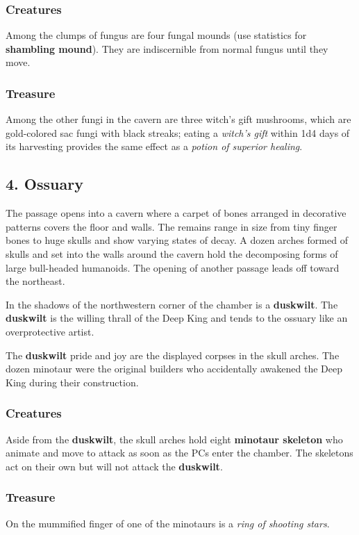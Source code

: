 \documentclass[10pt,a4paper,twoside,bg=print,twocolumn,openany,nodeprecatedcode]{dndbook}
\begin{document}
\subsubsection{Creatures}
Among the clumps of fungus are four fungal mounds (use statistics for \textbf{shambling mound}). They are indiscernible from normal fungus until they move.

\subsubsection{Treasure}
Among the other fungi in the cavern are three witch's gift mushrooms, which are gold-colored sac fungi with black streaks; eating a \textit{witch's gift} within 1d4 days of its harvesting provides the same effect as a \textit{potion of superior healing}.

\subsection{4. Ossuary}
\begin{DndReadAloud}{}
The passage opens into a cavern where a carpet of bones arranged in decorative patterns covers the floor and walls. The remains range in size from tiny finger bones to huge skulls and show varying states of decay. A dozen arches formed of skulls and set into the walls around the cavern hold the decomposing forms of large bull-headed humanoids. The opening of another passage leads off toward the northeast.

\end{DndReadAloud}

In the shadows of the northwestern corner of the chamber is a \textbf{duskwilt}. The \textbf{duskwilt} is the willing thrall of the Deep King and tends to the ossuary like an overprotective artist.

The \textbf{duskwilt} pride and joy are the displayed corpses in the skull arches. The dozen minotaur were the original builders who accidentally awakened the Deep King during their construction.

\subsubsection{Creatures}
Aside from the \textbf{duskwilt}, the skull arches hold eight \textbf{minotaur skeleton} who animate and move to attack as soon as the PCs enter the chamber. The skeletons act on their own but will not attack the \textbf{duskwilt}.

\subsubsection{Treasure}
On the mummified finger of one of the minotaurs is a \textit{ring of shooting stars}.
\end{document}
